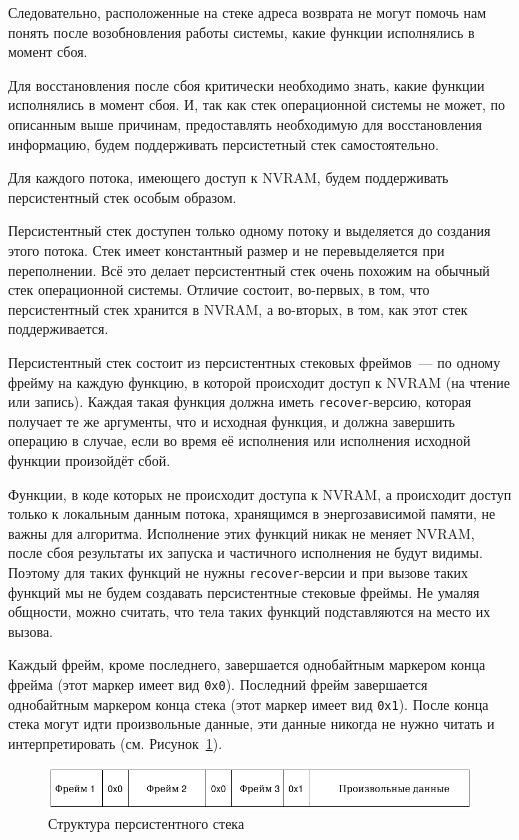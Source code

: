 \documentclass[times,specification,annotation]{itmo-student-thesis}
\begin{document}
Следовательно, расположенные на стеке адреса возврата не могут помочь нам понять после возобновления работы системы, какие функции исполнялись в момент сбоя.

Для восстановления после сбоя критически необходимо знать, какие функции исполнялись в момент сбоя. И, так как стек операционной системы не может, по описанным выше причинам, предоставлять необходимую для восстановления информацию, будем поддерживать персистетный стек самостоятельно.

Для каждого потока, имеющего доступ к NVRAM, будем поддерживать персистентный стек особым образом.

Персистентный стек доступен только одному потоку и выделяется до создания этого потока. Стек имеет константный размер и не перевыделяется при переполнении. Всё это делает персистентный стек очень похожим на обычный стек операционной системы. Отличие состоит, во-первых, в том, что персистентный стек хранится в NVRAM, а во-вторых, в том, как этот стек поддерживается.

Персистентный стек состоит из персистентных стековых фреймов~--- по одному фрейму на каждую функцию, в которой происходит доступ к NVRAM (на чтение или запись). Каждая такая функция должна иметь \texttt{recover}-версию, которая получает те же аргументы, что и исходная функция, и должна завершить операцию в случае, если во время её исполнения или исполнения исходной функции произойдёт сбой.

Функции, в коде которых не происходит доступа к NVRAM, а происходит доступ только к локальным данным потока, хранящимся в энергозависимой памяти, не важны для алгоритма. Исполнение этих функций никак не меняет NVRAM, после сбоя результаты их запуска и частичного исполнения не будут видимы. Поэтому для таких функций не нужны \texttt{recover}-версии и при вызове таких функций мы не будем создавать персистентные стековые фреймы. Не умаляя общности, можно считать, что тела таких функций подставляются на место их вызова.

Каждый фрейм, кроме последнего, завершается однобайтным маркером конца фрейма (этот маркер имеет вид \texttt{0х0}). Последний фрейм завершается однобайтным маркером конца стека (этот маркер имеет вид \texttt{0х1}). После конца стека могут идти произвольные данные, эти данные никогда не нужно читать и интерпретировать (см. Рисунок~\ref{stack-structure-pic}).

\begin{figure}[H]
  \centering
  \caption{Структура персистентного стека}
  \label{stack-structure-pic}
  \includegraphics[width=\linewidth]{1.png}
\end{figure}
\end{document}
